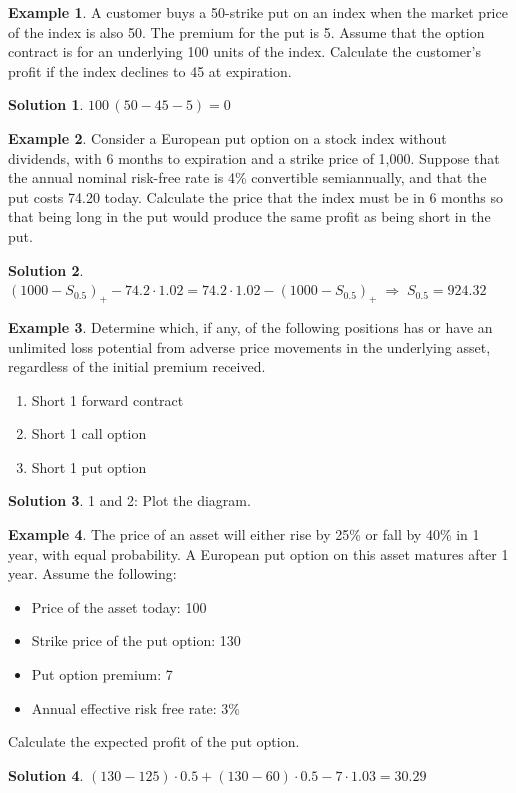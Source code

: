 \documentclass[10pt,handout]{beamer}
\newcommand{\ie}{\;\Longrightarrow\;}
\theoremstyle{definition}
\newtheorem*{ex}{Example}
\newtheorem*{sol}{Solution}
\begin{document}
\begin{frame}
  \begin{ex}
    A customer buys a 50-strike put on an index when the market price of the index is also 50. The premium for the put is 5. Assume that the option contract is for an underlying 100 units of the index. Calculate the customer's profit if the index declines to 45 at expiration.
  \end{ex}
  \begin{sol}
    $100\,(50 - 45 - 5) = 0$
  \end{sol}
  \begin{ex}
    Consider a European put option on a stock index without dividends, with 6 months to expiration and a strike price of 1,000. Suppose that the annual nominal risk-free rate is 4\% convertible semiannually, and that the put costs 74.20 today. Calculate the price that the index must be in 6 months so that being long in the put would produce the same profit as being short in the put.
  \end{ex}
  \begin{sol}
    $(1000 - S_{0.5})_+ - 74.2\cdot 1.02 = 74.2\cdot 1.02 - (1000 - S_{0.5})_+\ie S_{0.5} = 924.32$
  \end{sol}
\end{frame}

\begin{frame}
  \begin{ex}
    Determine which, if any, of the following positions has or have an unlimited loss potential from adverse price movements in the underlying asset, regardless of the initial premium received.
    \begin{enumerate}
      \item Short 1 forward contract
      \item Short 1 call option
      \item Short 1 put option
    \end{enumerate}
  \end{ex}
  \begin{sol}
    1 and 2: Plot the diagram.
  \end{sol}
\end{frame}

\begin{frame}
  \begin{ex}
    The price of an asset will either rise by 25\% or fall by 40\% in 1 year, with equal probability. A European put option on this asset matures after 1 year. Assume the following:
    \begin{itemize}
      \item Price of the asset today: 100
      \item Strike price of the put option: 130
      \item Put option premium: 7
      \item Annual effective risk free rate: 3\%
    \end{itemize}
    Calculate the expected profit of the put option.
  \end{ex}
  \begin{sol}
    $(130 - 125)\cdot 0.5 + (130 - 60)\cdot 0.5 - 7\cdot 1.03 = 30.29$
  \end{sol}
\end{frame}
\end{document}

